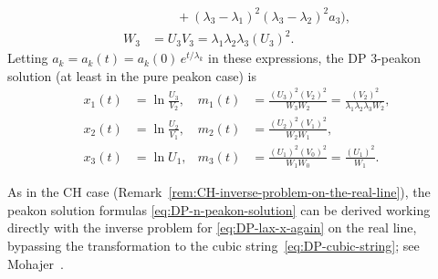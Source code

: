 \documentclass[10pt,a4paper]{article} \pdfoutput=1 
\begin{document}
\begin{example}
\begin{equation*}
\begin{split}
      & \qquad
        + (\lambda_3-\lambda_1)^2 (\lambda_3-\lambda_2)^2 a_3
      \Bigr)
      ,
      \\
      W_3 &= U_3 V_3 = \lambda_1 \lambda_2 \lambda_3 (U_3)^2
      .
    \end{split}
  \end{equation*}
  Letting $a_k = a_k(t) = a_k(0) \, e^{t/\lambda_k}$ in these expressions, the DP $3$-peakon solution
  (at least in the pure peakon case) is
  \begin{equation}
    \label{eq:DP-threepeakon}
    \begin{aligned}
      x_1(t) &= \ln\frac{U_3}{V_2}
      , &
      m_1(t) &= \frac{(U_3)^2 (V_2)^2}{W_3 W_2} = \frac{(V_2)^2}{\lambda_1 \lambda_2 \lambda_3 W_2}
      , \\
      x_2(t) &= \ln\frac{U_2}{V_1}
      , &
      m_2(t) &= \frac{(U_2)^2 (V_1)^2}{W_2 W_1}
      , \\
      x_3(t) &
      = \ln U_1
      , &
      m_3(t) &= \frac{(U_1)^2 (V_0)^2}{W_1 W_0} = \frac{(U_1)^2}{W_1}
      .
    \end{aligned}
  \end{equation}
\end{example}

\begin{remark}
  \label{rem:DP-inverse-problem-on-the-real-line}
  As in the CH case (Remark~\ref{rem:CH-inverse-problem-on-the-real-line}),
  the peakon solution formulas \eqref{eq:DP-n-peakon-solution} can be derived working directly
  with the inverse problem for \eqref{eq:DP-lax-x-again}
  on the real line, bypassing the transformation to the cubic string~\eqref{eq:DP-cubic-string};
  see Mohajer~\cite{mohajer:2017:DP-peakon-inverse-problem}.
\end{remark}
\end{document}
